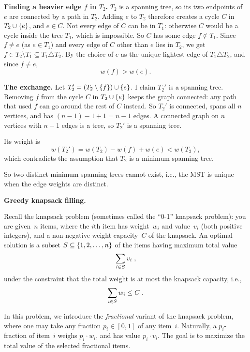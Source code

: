 \documentclass[11pt,addpoints,answers]{exam}
\begin{document}
\begin{questions}
\begin{parts}
\begin{solution}
      \textbf{Finding a heavier edge $f$ in $T_2$.}
      $T_2$ is a spanning tree, so its two endpoints of $e$ are connected by a path in $T_2$.
      Adding $e$ to $T_2$ therefore creates a cycle $C$ in $T_2 \cup \left\{e\right\}$, and $e \in C$.
      Not every edge of $C$ can be in $T_1$: otherwise $C$ would be a cycle inside the tree $T_1$, which is impossible.
      So $C$ has some edge $f \notin T_1$.
      Since $f \ne e$ (as $e \in T_1$) and every edge of $C$ other than $e$ lies in $T_2$, we get $f \in T_2 \setminus T_1 \subseteq T_1 \triangle T_2$.
      By the choice of $e$ as the unique lightest edge of $T_1 \triangle T_2$, and since $f \ne e$,
      \[
        w(f) > w(e).
      \]

      \textbf{The exchange.}
      Let $T_2' = (T_2 \setminus \left\{f\right\}) \cup \left\{e\right\}$.
      I claim $T_2'$ is a spanning tree.
      Removing $f$ from the cycle $C$ in $T_2 \cup \left\{e\right\}$ keeps the graph connected: any path that used $f$ can go around the rest of $C$ instead.
      So $T_2'$ is connected, spans all $n$ vertices, and has $(n-1) - 1 + 1 = n-1$ edges.
      A connected graph on $n$ vertices with $n-1$ edges is a tree, so $T_2'$ is a spanning tree.

      Its weight is
      \[
        w(T_2') = w(T_2) - w(f) + w(e) < w(T_2),
      \]
      which contradicts the assumption that $T_2$ is a minimum spanning tree.

      So two distinct minimum spanning trees cannot exist, i.e., the MST is unique when the edge weights are distinct.
    \end{solution}

  \end{parts}


  \question \textbf{Greedy knapsack filling.} \nopagebreak
    
  Recall the knapsack problem (sometimes called the ``0-1'' knapsack problem): you are given~$n$ items, where the $i$th item has weight~$w_{i}$ and value~$v_{i}$ (both positive integers), and a non-negative weight capacity~$C$ of the knapsack.
  An optimal solution is a subset $S\subseteq \left\{1, 2, \ldots, n\right\}$ of the items having maximum total value \[ \sum_{i\in S} v_i \; \text, \] under the constraint that the total weight is at most the knapsack capacity, i.e., \[ \sum_{i\in S} w_i \leq C \; \text. 
  \]

  In this problem, we introduce the \emph{fractional} variant of the knapsack problem, where one may take any fraction $p_i \in [0,1]$ of any item~$i$.
  Naturally, a $p_i$-fraction of item~$i$ weighs $p_i \cdot w_i$, and has value $p_i \cdot v_i$.
  The goal is to maximize the total value of the selected fractional items.


\end{questions}
\end{document}
